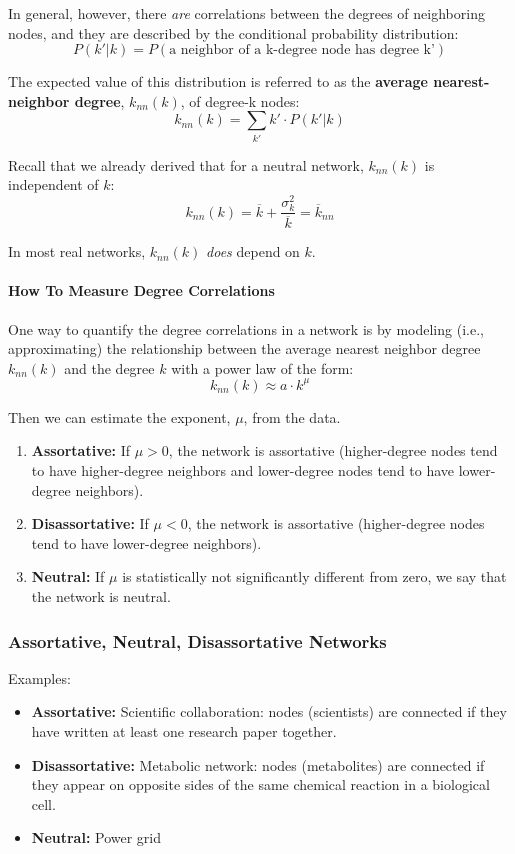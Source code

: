 \documentclass[11pt]{scrartcl} %
\begin{document}
In general, however, there \emph{are} correlations between the degrees of neighboring nodes, and they are described by the conditional probability distribution:
\[ P(k' | k) = P(\text{a neighbor of a k-degree node has degree k'}) \]

The expected value of this distribution is referred to as the \textbf{average nearest-neighbor degree}, $k_{nn}(k)$, of degree-k nodes:
\[k_{nn}(k) = \sum_{k'} k' \cdot P(k'|k) \]

Recall that we already derived that for a neutral network, $k_{nn}(k)$ is independent of $k$:
\[ k_{nn}(k) = \overline{k} + \frac{\sigma_k^2}{\overline{k}} = \overline{k}_{nn} \] 

In most real networks, $k_{nn}(k)$ \emph{does} depend on $k$.

\paragraph{How To Measure Degree Correlations}
One way to quantify the degree correlations in a network is by modeling (i.e., approximating) the relationship between the average nearest neighbor degree $k_{nn}(k)$ and the degree $k$ with a power law of the form:
\[ k_{nn}(k) \approx a \cdot k^\mu \] 

Then we can estimate the exponent, $\mu$, from the data.
\begin{enumerate}
	\item \textbf{Assortative:} If $\mu>0$, the network is assortative (higher-degree nodes tend to have higher-degree neighbors and lower-degree nodes tend to have lower-degree neighbors).
	\item \textbf{Disassortative:} If $\mu<0$, the network is assortative (higher-degree nodes tend to have lower-degree neighbors).
	\item \textbf{Neutral:} If $\mu$ is statistically not significantly different from zero, we say that the network is neutral.
\end{enumerate}

\subsubsection{Assortative, Neutral, Disassortative Networks}
Examples:
\begin{itemize}
	\item \textbf{Assortative:} Scientific collaboration: nodes (scientists) are connected if they have written at least one research paper together. 
	\item \textbf{Disassortative:} Metabolic network: nodes (metabolites) are connected if they appear on opposite sides of the same chemical reaction in a biological cell.
	\item \textbf{Neutral:} Power grid
\end{itemize}
\end{document}
